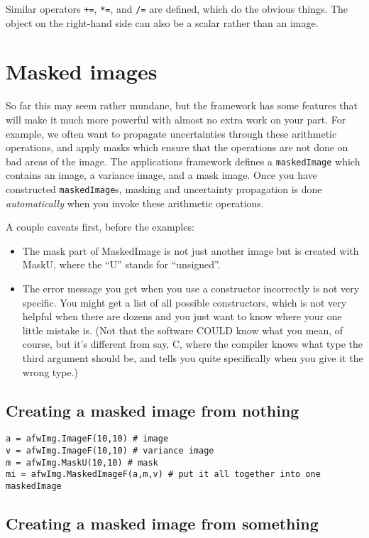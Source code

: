 \documentclass{book}
\begin{document}
Similar operators \texttt{+=}, \texttt{*=}, and \texttt{/=} are
defined, which do the obvious things.  The object on the right-hand
side can also be a scalar rather than an image.

\section{Masked images}

So far this may seem rather mundane, but the framework has some
features that will make it much more powerful with almost no extra
work on your part.  For example, we often want to propagate
uncertainties through these arithmetic operations, and apply masks
which ensure that the operations are not done on bad areas of the
image.  The applications framework defines a \texttt{maskedImage}
which contains an image, a variance image, and a mask image.
Once you have constructed \texttt{maskedImage}s, masking and
uncertainty propagation is done {\it automatically} when you invoke
these arithmetic operations.

A couple caveats first, before the examples:
\begin{itemize}
\item The mask part of MaskedImage is not just another image but
is created with MaskU, where the ``U'' stands for ``unsigned''.
\item The error message you get when you use a constructor
incorrectly is not very specific.  You might get a list of all
possible constructors, which is not very helpful when there
are dozens and you just want to know where your one little mistake
is.  (Not that the software COULD know what you mean, of course,
but it's different from say, C, where the compiler knows what type
the third argument should be, and tells you quite specifically when you
give it the wrong type.)
\end{itemize}

\subsection{Creating a masked image from nothing}

\begin{verbatim}
a = afwImg.ImageF(10,10) # image
v = afwImg.ImageF(10,10) # variance image
m = afwImg.MaskU(10,10) # mask
mi = afwImg.MaskedImageF(a,m,v) # put it all together into one maskedImage
\end{verbatim}


\subsection{Creating a masked image from something}
\end{document}
